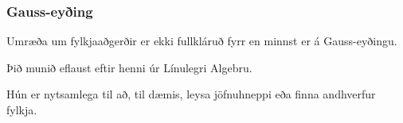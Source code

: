 {
}

{
	\frametitle{Gauss-eyðing}
	{
		\item<1-> Umræða um fylkjaaðgerðir er ekki fullkláruð fyrr en minnst er á Gauss-eyðingu.
		\item<2-> Þið munið eflaust eftir henni úr Línulegri Algebru.
		\item<3-> Hún er nytsamlega til að, til dæmis, leysa jöfnuhneppi eða finna andhverfur fylkja.
	}
}

{
}

{
}




